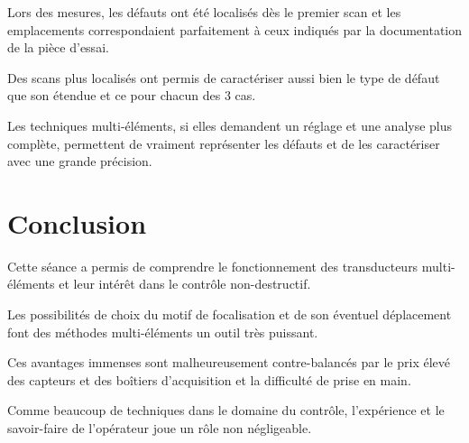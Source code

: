 Lors des mesures, les défauts ont été localisés dès le premier scan et les emplacements correspondaient parfaitement à ceux indiqués par la documentation de la pièce d'essai.

Des scans plus localisés ont permis de caractériser aussi bien le type de défaut que son étendue et ce pour chacun des 3 cas.

Les techniques multi-éléments, si elles demandent un réglage et une analyse plus complète, permettent de vraiment représenter les défauts et de les caractériser avec une grande précision.

\section*{Conclusion}

Cette séance a permis de comprendre le fonctionnement des transducteurs multi-éléments et leur intérêt dans le contrôle non-destructif.

Les possibilités de choix du motif de focalisation et de son éventuel déplacement font des méthodes multi-éléments un outil très puissant.

Ces avantages immenses sont malheureusement contre-balancés par le prix élevé des capteurs et des boîtiers d'acquisition et la difficulté de prise en main.

Comme beaucoup de techniques dans le domaine du contrôle, l'expérience et le savoir-faire de l'opérateur joue un rôle non négligeable.